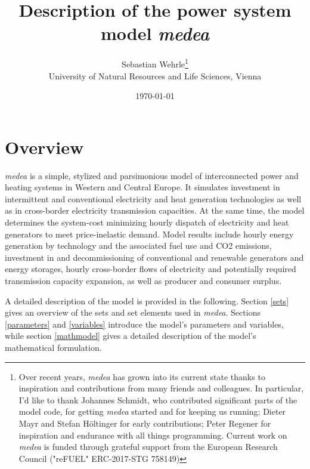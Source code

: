 \documentclass[11pt,a4paper]{article}
\title{Description of the power system model \emph{medea}}
\date{\today}
\author{Sebastian Wehrle\thanks{Over recent years, \emph{medea} has grown into its current state thanks to inspiration and contributions from many friends and colleagues. 
In particular, I'd like to thank Johannes Schmidt, who contributed significant parts of the model code, for getting \emph{medea} started and for keeping us running; Dieter Mayr and Stefan Höltinger for early contributions; Peter Regener for inspiration and endurance with all things programming. Current work on \emph{medea} is funded through grateful support from the European Research Council ("reFUEL" ERC-2017-STG 758149)} \\University of Natural Resources and Life Sciences, Vienna}
\begin{document}
\maketitle
\section{Overview}
\emph{medea} is a simple, stylized and parsimonious model of interconnected power and heating systems in Western and Central Europe.
It simulates investment in intermittent and conventional electricity and heat generation technologies as well as in cross-border electricity transmission capacities.
At the same time, the model determines the system-cost minimizing hourly dispatch of electricity and heat generators to meet price-inelastic demand.
Model results include hourly energy generation by technology and the associated fuel use and CO2 emissions, investment in and decommissioning of conventional and renewable generators and energy storages, hourly cross-border flows of electricity and potentially required transmission capacity expansion, as well as producer and consumer surplus.

A detailed description of the model is provided in the following. Section \ref{sets} gives an overview of the sets and set elements used in \emph{medea}. Sections \ref{parameters} and \ref{variables} introduce the model's parameters and variables, while section \ref{mathmodel} gives a detailed description of the model's mathematical formulation.

\newpage
\end{document}
